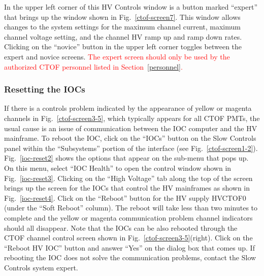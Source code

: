 \documentclass[12pt]{article}
\begin{document}
In the upper left corner of this HV Controls window is a button marked ``expert'' that brings up the window
shown in Fig.~\ref{ctof-screen7}. This window allows changes to the system settings for the maximum channel
current, maximum channel voltage setting, and the channel HV ramp up and ramp down rates. Clicking on the 
``novice'' button in the upper left corner toggles between the expert and novice screens. \textcolor{red}{The
expert screen should only be used by the authorized CTOF personnel listed in Section~\ref{personnel}.} 

\subsubsection{Resetting the IOCs}
\label{reset-iocs}

If there is a controls problem indicated by the appearance of yellow or magenta channels in
Fig.~\ref{ctof-screen3-5}, which typically appears for all CTOF PMTs, the usual cause is an issue of
communication between the IOC computer and the HV mainframe. To reboot the IOC, click on the ``IOCs''
button on the Slow Controls panel within the ``Subsystems'' portion of the interface (see
Fig.~\ref{ctof-screen1-2}). Fig.~\ref{ioc-reset2} shows the options that appear on the sub-menu that pops
up. On this menu, select ``IOC Health'' to open the control window shown in Fig.~\ref{ioc-reset3}. Clicking on
the ``High Voltage'' tab along the top of the screen brings up the screen for the IOCs that control the HV
mainframes as shown in Fig.~\ref{ioc-reset4}. Click on the ``Reboot'' button for the HV supply HVCTOF0
(under the ``Soft Reboot'' column). The reboot will take less than two minutes to complete and the yellow or
magenta communication problem channel indicators should all disappear. Note that the IOCs can be also
rebooted through the CTOF channel control screen shown in Fig.~\ref{ctof-screen3-5}(right). Click on the
``Reboot HV IOC'' button and answer ``Yes'' on the dialog box that comes up. If rebooting the IOC does not
solve the communication problems, contact the Slow Controls system expert.
\end{document}
